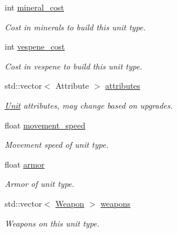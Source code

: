 \begin{DoxyCompactItemize}
int \hyperlink{structsc2_1_1_unit_type_data_a50b767a68415cb1acbf246ee7f52ddcb}{mineral\+\_\+cost}
\begin{DoxyCompactList}\small\item\em Cost in minerals to build this unit type. \end{DoxyCompactList}\item 
\mbox{\label{structsc2_1_1_unit_type_data_af596e50795f2b903b633cc7a72d43ae5}} 
int \hyperlink{structsc2_1_1_unit_type_data_af596e50795f2b903b633cc7a72d43ae5}{vespene\+\_\+cost}
\begin{DoxyCompactList}\small\item\em Cost in vespene to build this unit type. \end{DoxyCompactList}\item 
\mbox{\label{structsc2_1_1_unit_type_data_a1a07aba0d860ed9439104895ef2fc1f9}} 
std\+::vector$<$ Attribute $>$ \hyperlink{structsc2_1_1_unit_type_data_a1a07aba0d860ed9439104895ef2fc1f9}{attributes}
\begin{DoxyCompactList}\small\item\em \hyperlink{classsc2_1_1_unit}{Unit} attributes, may change based on upgrades. \end{DoxyCompactList}\item 
\mbox{\label{structsc2_1_1_unit_type_data_ac26ad858a8101e13d323c4111df9700b}} 
float \hyperlink{structsc2_1_1_unit_type_data_ac26ad858a8101e13d323c4111df9700b}{movement\+\_\+speed}
\begin{DoxyCompactList}\small\item\em Movement speed of unit type. \end{DoxyCompactList}\item 
\mbox{\label{structsc2_1_1_unit_type_data_afadeb2efc945bac24492cd4efd0dba28}} 
float \hyperlink{structsc2_1_1_unit_type_data_afadeb2efc945bac24492cd4efd0dba28}{armor}
\begin{DoxyCompactList}\small\item\em Armor of unit type. \end{DoxyCompactList}\item 
\mbox{\label{structsc2_1_1_unit_type_data_aad375db4df763eafc47589a1b20c8553}} 
std\+::vector$<$ \hyperlink{structsc2_1_1_weapon}{Weapon} $>$ \hyperlink{structsc2_1_1_unit_type_data_aad375db4df763eafc47589a1b20c8553}{weapons}
\begin{DoxyCompactList}\small\item\em Weapons on this unit type. \end{DoxyCompactList}\end{DoxyCompactItemize}


